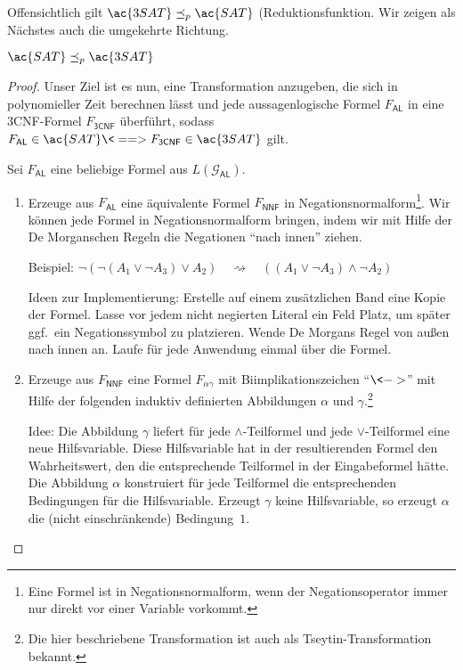 Offensichtlich gilt $\ac{3SAT} \preceq_p \ac{SAT}$ (Reduktionsfunktion.
Wir zeigen als Nächstes auch die umgekehrte Richtung.

\begin{lemma}\label{lem:sat3sat}
	$\ac{SAT} \preceq_p \ac{3SAT}$
\end{lemma}


\begin{proof}
Unser Ziel ist es nun, eine Transformation anzugeben, die sich in polynomieller Zeit berechnen lässt und jede aussagenlogische Formel $F_\mathsf{AL}$ in eine 3CNF-Formel $F_\mathsf{3CNF}$ überführt, sodass
$F_\mathsf{AL}\in \ac{SAT} \<==> F_\mathsf{3CNF}\in \ac{3SAT}$
gilt.

Sei $F_\mathsf{AL}$ eine beliebige Formel aus $L(\mathcal{G}_\mathsf{AL})$.

\begin{enumerate}
 \item Erzeuge aus $F_\mathsf{AL}$ eine äquivalente Formel $F_\mathsf{NNF}$ in Negationsnormalform\footnote{Eine Formel ist in Negationsnormalform, wenn der Negationsoperator immer nur direkt vor einer Variable vorkommt.}.
 Wir können jede Formel in Negationsnormalform bringen, indem wir mit Hilfe der De Morganschen Regeln die Negationen "`nach innen"' ziehen.
 
 Beispiel: $\neg(\neg (A_1\lor \neg A_3)\lor A_2) \quad\rightsquigarrow\quad ((A_1\lor \neg A_3)\land \neg A_2)$
 
 Ideen zur Implementierung: Erstelle auf einem zusätzlichen Band eine Kopie der Formel.
 Lasse vor jedem nicht negierten Literal ein Feld Platz, um später ggf.\ ein Negationssymbol zu platzieren.
 Wende De Morgans Regel von außen nach innen an.
 Laufe für jede Anwendung einmal über die Formel.
 
 
 \item Erzeuge aus $F_\mathsf{NNF}$ eine Formel $F_{\alpha\gamma}$ mit Biimplikationszeichen "`$\<->$"' mit Hilfe der folgenden induktiv definierten Abbildungen $\alpha$ und $\gamma$.\footnote{%
 Die hier beschriebene Transformation ist auch als Tseytin-Transformation bekannt.}
 
 Idee: Die Abbildung $\gamma$ liefert für jede $\land$-Teilformel und jede $\lor$-Teilformel eine neue Hilfsvariable.
 Diese Hilfsvariable hat in der resultierenden Formel den Wahrheitswert, den die entsprechende Teilformel in der Eingabeformel hätte.
 Die Abbildung $\alpha$ konstruiert für jede Teilformel die entsprechenden Bedingungen für die Hilfsvariable.
 Erzeugt $\gamma$ keine Hilfsvariable, so erzeugt $\alpha$ die (nicht einschränkende) Bedingung~$1$.
 

\end{enumerate}
\end{proof}
